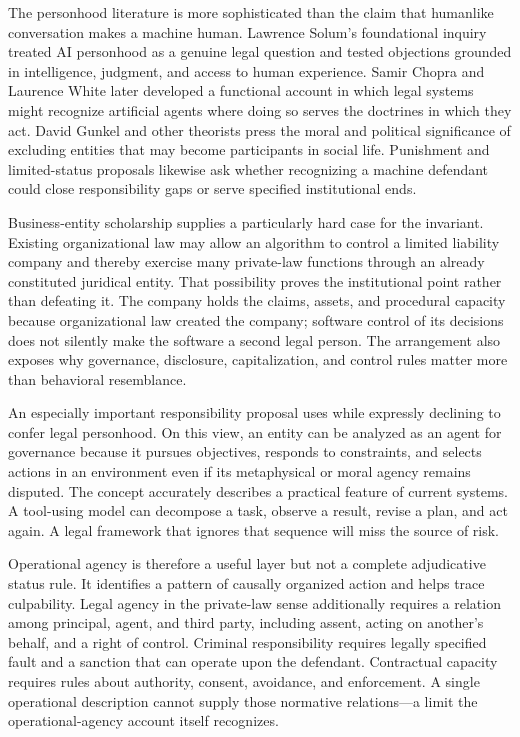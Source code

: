 The personhood literature is more sophisticated than the claim that humanlike conversation makes a machine human. Lawrence Solum's foundational inquiry treated AI personhood as a genuine legal question and tested objections grounded in intelligence, judgment, and access to human experience. Samir Chopra and Laurence White later developed a functional account in which legal systems might recognize artificial agents where doing so serves the doctrines in which they act. David Gunkel and other theorists press the moral and political significance of excluding entities that may become participants in social life. Punishment and limited-status proposals likewise ask whether recognizing a machine defendant could close responsibility gaps or serve specified institutional ends.

Business-entity scholarship supplies a particularly hard case for the invariant. Existing organizational law may allow an algorithm to control a limited liability company and thereby exercise many private-law functions through an already constituted juridical entity. That possibility proves the institutional point rather than defeating it. The company holds the claims, assets, and procedural capacity because organizational law created the company; software control of its decisions does not silently make the software a second legal person. The arrangement also exposes why governance, disclosure, capitalization, and control rules matter more than behavioral resemblance.

An especially important responsibility proposal uses  while expressly declining to confer legal personhood. On this view, an entity can be analyzed as an agent for governance because it pursues objectives, responds to constraints, and selects actions in an environment even if its metaphysical or moral agency remains disputed. The concept accurately describes a practical feature of current systems. A tool-using model can decompose a task, observe a result, revise a plan, and act again. A legal framework that ignores that sequence will miss the source of risk.

Operational agency is therefore a useful layer but not a complete adjudicative status rule. It identifies a pattern of causally organized action and helps trace culpability. Legal agency in the private-law sense additionally requires a relation among principal, agent, and third party, including assent, acting on another's behalf, and a right of control. Criminal responsibility requires legally specified fault and a sanction that can operate upon the defendant. Contractual capacity requires rules about authority, consent, avoidance, and enforcement. A single operational description cannot supply those normative relations---a limit the operational-agency account itself recognizes.

